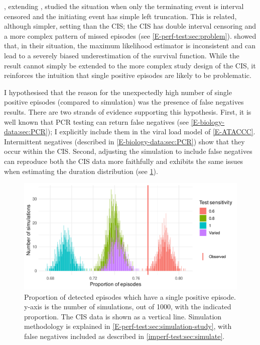 \documentclass[thesis.tex]{subfiles}
\begin{document}
\Textcite{shenNonparametrica}, extending \textcite{panNote}, studied the situation when only the terminating event is interval censored and the initiating event has simple left truncation.
This is related, although simpler, setting than the CIS; the CIS has double interval censoring and a more complex pattern of missed episodes (see \cref{E-perf-test:sec:problem}).
\Textcite{shenNonparametrica} showed that, in their situation, the maximum likelihood estimator is inconsistent and can lead to a severely biased underestimation of the survival function.
While the result cannot simply be extended to the more complex study design of the CIS, it reinforces the intuition that single positive episodes are likely to be problematic.

I hypothesised that the reason for the unexpectedly high number of single positive episodes (compared to simulation) was the presence of false negatives results.
There are two strands of evidence supporting this hypothesis.
First, it is well known that PCR testing can return false negatives  (see \cref{E-biology-data:sec:PCR}); I explicitly include them in the viral load model of \cref{E-ATACCC}.
Intermittent negatives (described in  \cref{E-biology-data:sec:PCR}) show that they occur within the CIS.
Second, adjusting the simulation to include false negatives can reproduce both the CIS data more faithfully and exhibits the same issues when estimating the duration distribution (see \cref{imperf-test:fig:sim-single-pos}).
\begin{figure}
  \centering \includegraphics{cis-imperfect-testing/sim-single-positive-episodes}
  \caption[Single positive episodes in CIS simulation]{%
    Proportion of detected episodes which have a single positive episode.
    y-axis is the number of simulations, out of 1000, with the indicated proportion.
    The CIS data is shown as a vertical line.
    Simulation methodology is explained in \cref{E-perf-test:sec:simulation-study}, with false negatives included as described in \cref{imperf-test:sec:simulate}.
  }
  \label{imperf-test:fig:sim-single-pos}
\end{figure}
\end{document}
